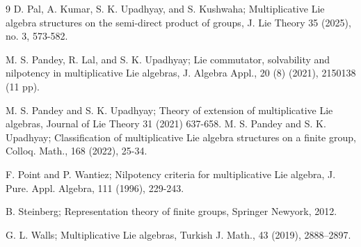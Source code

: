 \documentclass[10 pt,oneside,reqno,a4paper]{amsart}
\numberwithin{equation}{section}
\begin{document}
\begin{thebibliography}{9}
  D. Pal, A. Kumar, S. K. Upadhyay, and S. Kushwaha;
Multiplicative Lie algebra structures on the semi-direct product of groups, J. Lie Theory 35 (2025), no. 3, 573-582.

M. S. Pandey, R. Lal, and S. K. Upadhyay;
Lie commutator, solvability and nilpotency in multiplicative Lie algebras, J. Algebra Appl., 20 (8) (2021), 2150138 (11 pp).
    
		M. S. Pandey and S. K. Upadhyay; Theory of extension of multiplicative Lie algebras, Journal of Lie Theory 31 (2021) 637-658.
M. S. Pandey and S. K. Upadhyay; Classification of multiplicative Lie algebra structures on a finite group, Colloq. Math., 168 (2022), 25-34.

F. Point and P. Wantiez;
Nilpotency criteria for multiplicative Lie algebra, J. Pure. Appl. Algebra, 111 (1996), 229-243.


B. Steinberg; Representation theory of finite groups, Springer Newyork, 2012.

G. L. Walls;
Multiplicative Lie algebras, {Turkish J. Math.}, 43 (2019), 2888–2897.



\end{thebibliography}
\end{document}
